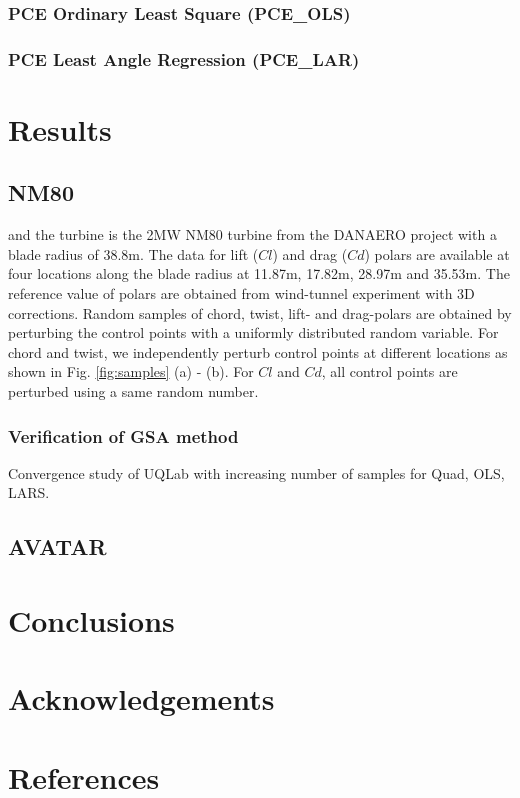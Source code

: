 \documentclass[review]{elsarticle}
\numberwithin{equation}{section}
\newcommand{\myreferences}{../references,../Mendeley_refs}
\numberwithin{equation}{section}
\begin{document}
\subsubsection{PCE Ordinary Least Square (PCE\_OLS)}
\subsubsection{PCE Least Angle Regression (PCE\_LAR)}





\section{Results}\label{sec:results}

\subsection{NM80}
 and the turbine is the 2MW NM80 turbine from the DANAERO project \cite{Troldborg2013} with a blade radius of 38.8m. The data for lift ($Cl$) and drag ($Cd$) polars are available at four locations along the blade radius at 11.87m, 17.82m, 28.97m and 35.53m. The reference value of polars are obtained from wind-tunnel experiment with 3D corrections. Random samples of chord, twist, lift- and drag-polars are obtained by perturbing the control points with a uniformly distributed random variable. For chord and twist, we independently perturb control points at different locations as shown in Fig. \ref{fig:samples} (a) - (b). For $Cl$ and $Cd$, all control points are perturbed using a same random number.
 
\subsubsection{Verification of GSA method}
Convergence study of UQLab with increasing number of samples for Quad, OLS, LARS.

\subsection{AVATAR}

\section{Conclusions}\label{sec:conclusions}

\section*{Acknowledgements}

\newpage

\section{References}


\newpage

\appendix

\end{document}
